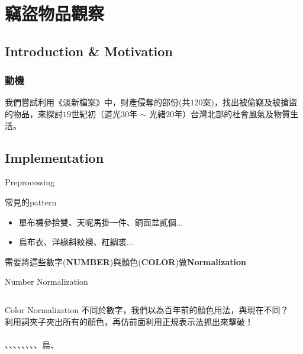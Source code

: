 \documentclass{beamer}
\begin{document}
\section{竊盜物品觀察}
\subsection{Introduction \& Motivation}
\begin{frame}
	\frametitle{動機}
    我們嘗試利用《淡新檔案》中，財產侵奪的部份(共$120$案)，找出被偷竊及被搶盜的物品，來探討$19$世紀初（道光$30$年 $\sim$ 光緒$20$年）台灣北部的社會風氣及物質生活。
\end{frame}
\subsection{Implementation}
\begin{frame}{Preprocessing}
\begin{block}{常見的pattern}
\begin{itemize}
    \item 單布襪參拾雙、天呢馬掛一件、銅面盆貳個...
    \item 烏布衣、洋綠斜紋襖、紅綢裘...
\end{itemize}
\MVRightarrow{} 需要將這些數字(\textbf{NUMBER})與顏色(\textbf{COLOR})做\textbf{Normalization}
\end{block}
\end{frame}

\begin{frame}{Number Normalization}
\inputminted{python}{code/normalize.py}    
\end{frame}

\begin{frame}{Color Normalization}
不同於數字，我們以為百年前的顏色用法，與現在不同？\\
\MVRightarrow{}利用詞夾子夾出所有的顏色，再仿前面利用正規表示法抓出來擊破！\\\\
\center \color{yellow}{黃}、\color{red}{紅}、\color{cyan}{青}、\color{green}{洋綠}、\color{magenta}{洋紅}、\color{black}{黑}、\colorbox{black}{\color{white}{白}}、\color{purple}{紫}、\color{black}烏、\color{blue}{藍}
\end{frame}
\end{document}
